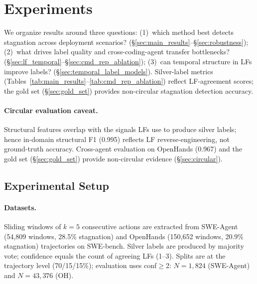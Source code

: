 \section{Experiments}
\label{sec:experiments}

We organize results around three questions:
(1)~which method best detects stagnation across deployment scenarios? (\S\ref{sec:main_results}--\S\ref{sec:robustness});
(2)~what drives label quality and cross-coding-agent transfer bottlenecks? (\S\ref{sec:lf_temporal}--\S\ref{sec:cmd_rep_ablation});
(3)~can temporal structure in LFs improve labels? (\S\ref{sec:temporal_label_models}).
Silver-label metrics (Tables~\ref{tab:main_results}--\ref{tab:cmd_rep_ablation}) reflect LF-agreement scores; the gold set (\S\ref{sec:gold_set}) provides non-circular stagnation detection accuracy.

\paragraph{Circular evaluation caveat.}
Structural features overlap with the signals LFs use to produce silver labels; hence in-domain structural F1 (0.995) reflects LF reverse-engineering, not ground-truth accuracy.
Cross-agent evaluation on OpenHands (0.967) and the gold set (\S\ref{sec:gold_set}) provide non-circular evidence (\S\ref{sec:circular}).

\subsection{Experimental Setup}
\label{sec:setup}

\paragraph{Datasets.}
Sliding windows of $k{=}5$ consecutive actions are extracted from SWE-Agent (54,809 windows, 28.5\% stagnation) \citep{jimenez2024swebench,yang2024sweagent} and OpenHands (150,652 windows, 20.9\% stagnation) \citep{wang2025openhands} trajectories on SWE-bench.
Silver labels are produced by majority vote; confidence equals the count of agreeing LFs (1--3).
Splits are at the trajectory level (70/15/15\%); evaluation uses conf${\geq}$2: $N{=}1{,}824$ (SWE-Agent) and $N{=}43{,}376$ (OH).

